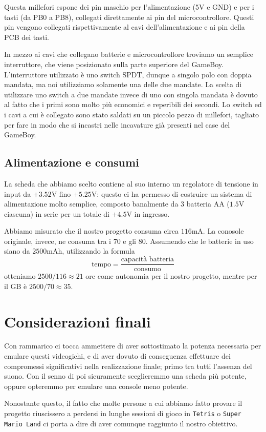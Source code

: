 \documentclass[hidelinks,12pt]{article}
\begin{document}
\begin{figure}[h]
\begin{center}
\begin{subfigure}[b]{0.4\textwidth}
\begin{center}
			\end{center}
			\caption{}
			\label{fig:pcb_side}
		\end{subfigure}
	\end{center}
	\caption{}
\end{figure}


Questa millefori espone dei pin maschio per l'alimentazione (5V e GND)
e per i tasti (da PB0 a PB8), collegati direttamente ai pin del
microcontrollore.
Questi pin vengono collegati rispettivamente al cavi dell'alimentazione e
ai pin della PCB dei tasti.

In mezzo ai cavi che collegano batterie e microcontrollore troviamo un semplice
interruttore, che viene posizionato sulla parte superiore del GameBoy.
L'interruttore utilizzato è uno switch SPDT, dunque a singolo polo con doppia
mandata, ma noi utilizziamo solamente una delle due mandate. La scelta di
utilizzare uno switch a due mandate invece di uno con singola mandata è dovuto
al fatto che i primi sono molto più economici e reperibili dei secondi.
Lo switch ed i cavi a cui è collegato sono stato saldati su un piccolo pezzo
di millefori, tagliato per fare in modo che si incastri nelle incavature già
presenti nel case del GameBoy.


\subsection{Alimentazione e consumi}
La scheda che abbiamo scelto contiene al suo interno un regolatore di tensione
in input da $+3.52$V fino $+5.25$V: questo ci ha permesso di costruire un
sistema di alimentazione molto semplice, composto banalmente da 3 batteria AA
($1.5$V ciascuna) in serie per un totale di $+4.5$V in ingresso.

Abbiamo misurato che il nostro progetto consuma circa $116$mA. La conosole
originale, invece, ne consuma tra i $70$ e gli $80$. Assumendo che le batterie
in uso siano da $2500$mAh, utilizzando la formula 
$$
\text{tempo} = \frac{\text{capacità batteria}}{\text{consumo}} 
$$
otteniamo $2500/116 \approx 21$ ore come autonomia per il nostro progetto,
mentre per il GB è $2500/70 \approx 35$.

\section{Considerazioni finali}

Con rammarico ci tocca ammettere di aver sottostimato la potenza necessaria per
emulare questi videogichi, e di aver dovuto di conseguenza effettuare dei
compromessi significativi nella realizzazione finale; primo tra tutti l'assenza
del suono. Con il senno di poi sicuramente sceglieremmo una scheda più potente,
oppure opteremmo per emulare una console meno potente.

Nonostante questo, il fatto che molte persone a cui abbiamo fatto provare il
progetto riuscissero a perdersi in lunghe sessioni di gioco in \texttt{Tetris}
o \texttt{Super Mario Land} ci porta a dire di aver comunque raggiunto il
nostro obiettivo.


\nocite{*}
\printbibliography
\end{document}
